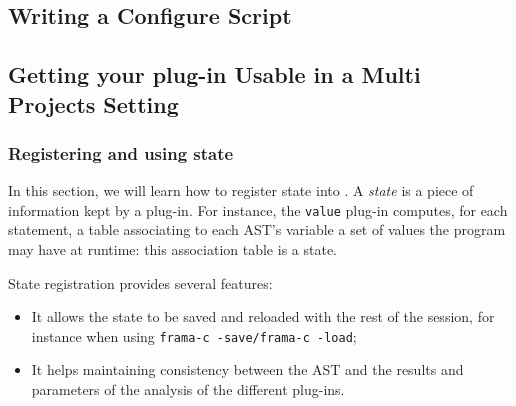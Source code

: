 


\subsection{Writing a Configure Script}\label{tut2:configure}
\todo


\subsection{Getting your plug-in Usable in a Multi Projects Setting}
\label{tut2:project-and-state}

\subsubsection{Registering and using state}

In this section, we will learn how to register state into \framac. A
\emph{state} is a piece of information kept by a plug-in. For instance,
the \texttt{value} plug-in computes, for each statement, a table associating to
each AST's variable a set of values the program may have at runtime: this
association table is a state.

State registration provides several features:
\begin{itemize}
\item It allows the state to be saved and reloaded with the rest of
  the session, for instance when using \texttt{frama-c -save/frama-c
    -load};
\item It helps maintaining consistency between the AST and the results and
  parameters of the analysis of the different plug-ins.
\end{itemize}

